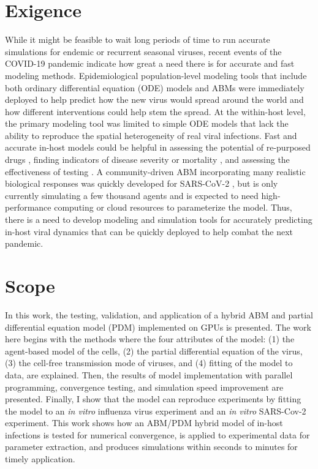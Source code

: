 \section{Exigence}
While it might be feasible to wait long periods of time to run accurate simulations for endemic or recurrent seasonal viruses, recent events of the COVID-19 pandemic indicate how great a need there is for accurate and fast modeling methods. Epidemiological population-level modeling tools that include both ordinary differential equation (ODE) models \citep{li20,ngonghala20} and ABMs \citep{ying21,sneppen21,kano21} were immediately deployed to help predict how the new virus would spread around the world and how different interventions could help stem the spread. At the within-host level, the primary modeling tool was limited to simple ODE models \citep{goncalves20,wang20model,hernandez20,dogra20} that lack the ability to reproduce the spatial heterogeneity of real viral infections. Fast and accurate in-host models could be helpful in assessing the potential of re-purposed drugs \citep{czuppon21,goncalves20,dodds20}, finding indicators of disease severity or mortality \citep{neant21}, and assessing the effectiveness of testing \citep{ejima21}. A community-driven ABM incorporating many realistic biological responses was quickly developed for SARS-CoV-2 \citep{getz21}, but is only currently simulating a few thousand agents and is expected to need high-performance computing or cloud resources to parameterize the model. Thus, there is a need to develop modeling and simulation tools for accurately predicting in-host viral dynamics that can be quickly deployed to help combat the next pandemic.

\section{Scope}

In this work, the testing, validation, and application of a hybrid ABM and partial differential equation model (PDM) implemented on GPUs is presented. The work here begins with the methods where the four attributes of the model: (1) the agent-based model of the cells, (2) the partial differential equation of the virus, (3) the cell-free transmission mode of viruses, and (4) fitting of the model to data, are explained.  Then, the results of model implementation with parallel programming, convergence testing, and simulation speed improvement are presented. Finally, I show that the model can reproduce experiments by fitting the model to an \emph{in vitro} influenza virus experiment and an \emph{in vitro} SARS-Cov-2 experiment. This work shows how an ABM/PDM hybrid model of in-host infections is tested for numerical convergence, is applied to experimental data for parameter extraction, and produces simulations within seconds to minutes for timely application. 




